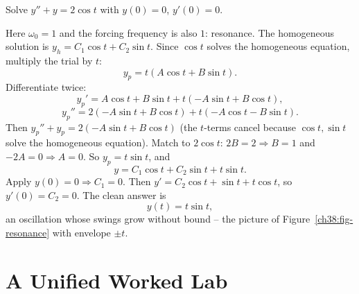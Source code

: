 \begin{example}
\label{ch38:ex-resonance}
Solve $y'' + y = 2\cos t$ with $y(0) = 0$, $y'(0) = 0$.

Here $\omega_0 = 1$ and the forcing frequency is also $1$: resonance. The
homogeneous solution is $y_h = C_1 \cos t + C_2 \sin t$. Since $\cos t$ solves the
homogeneous equation, multiply the trial by $t$:
\[
  y_p = t(A\cos t + B\sin t).
\]
Differentiate twice:
\[
  y_p' = A\cos t + B\sin t + t(-A\sin t + B\cos t),
\]
\[
  y_p'' = 2(-A\sin t + B\cos t) + t(-A\cos t - B\sin t).
\]
Then $y_p'' + y_p = 2(-A\sin t + B\cos t)$ (the $t$-terms cancel because $\cos t,
\sin t$ solve the homogeneous equation). Match to $2\cos t$: $2B = 2 \Rightarrow B
= 1$ and $-2A = 0 \Rightarrow A = 0$. So $y_p = t\sin t$, and
\[
  y = C_1\cos t + C_2 \sin t + t\sin t.
\]
Apply $y(0) = 0 \Rightarrow C_1 = 0$. Then $y' = C_2\cos t + \sin t + t\cos t$, so
$y'(0) = C_2 = 0$. The clean answer is
\[
  y(t) = t\sin t,
\]
an oscillation whose swings grow without bound -- the picture of
Figure~\ref{ch38:fig-resonance} with envelope $\pm t$.
\end{example}

\section{A Unified Worked Lab}
\label{ch38:lab}

